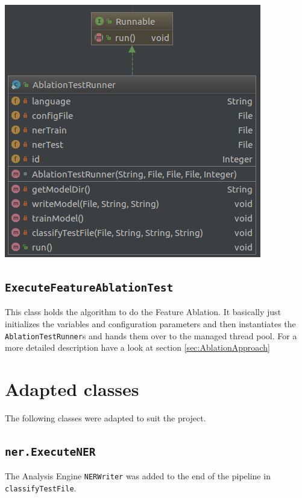 \documentclass[11pt, english]{article}
\begin{document}
\includegraphics[scale=0.5]{gfx/AblationTestRunner.png}
\label{fig:AblationTestRunner}


\subsection{\texttt{ExecuteFeatureAblationTest}}
\label{sec:ExecuteFeatureAblationTest}
This class holds the algorithm to do the Feature Ablation. It basically just initializes the variables and configuration parameters and then instantiates the \verb/AblationTestRunner/s and hands them over to the managed thread pool. For a more detailed description have a look at section \ref{sec:AblationApproach}



\section{Adapted classes}
The following classes were adapted to suit the project.

\subsection{\texttt{ner.ExecuteNER}}
The Analysis Engine \verb/NERWriter/ was added to the end of the pipeline in \verb/classifyTestFile/.
\end{document}
